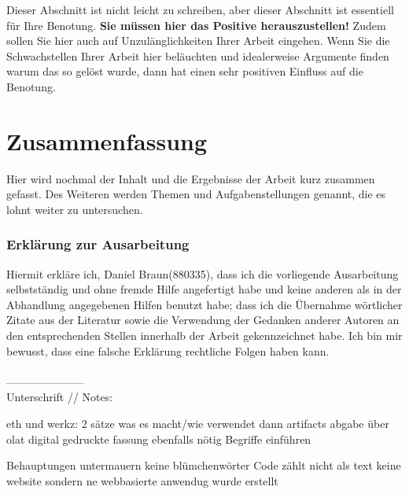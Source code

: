 \documentclass[fleqn,10pt,ngerman]{SelfArx}
\begin{document}
	Dieser Abschnitt ist nicht leicht zu schreiben, aber dieser Abschnitt ist essentiell für Ihre Benotung. \textbf{Sie müssen hier das Positive herauszustellen!} Zudem sollen Sie hier auch auf Unzul\"anglichkeiten Ihrer Arbeit eingehen. Wenn Sie die Schwachstellen Ihrer Arbeit hier bel\"auchten und idealerweise Argumente finden warum das so gelöst wurde, dann hat einen sehr positiven Einfluss auf die Benotung. 
	
	
	
	\section{Zusammenfassung}
	Hier wird nochmal der Inhalt und die Ergebnisse der Arbeit kurz zusammen gefasst. Des Weiteren werden Themen und Aufgabenstellungen genannt, die es lohnt weiter zu untersuchen.
	
	
	
	
	
	
	\subsubsection*{Erklärung zur Ausarbeitung}
	Hiermit erkläre ich, Daniel Braun(880335), dass ich die vorliegende Ausarbeitung selbstständig und ohne fremde Hilfe angefertigt habe und keine anderen als in der Abhandlung angegebenen Hilfen benutzt habe; dass ich die Übernahme wörtlicher Zitate aus der Literatur sowie die Verwendung der Gedanken anderer Autoren an den entsprechenden Stellen innerhalb der Arbeit gekennzeichnet habe. Ich bin mir bewusst, dass eine falsche Erklärung rechtliche Folgen haben kann.\\ \\
	--------------------- \\
	Unterschrift
	//
	Notes:
	
	
	eth und werkz: 2 sätze was es macht/wie verwendet dann artifacts
	abgabe über olat digital gedruckte fassung ebenfalls nötig
	Begriffe einführen

	Behauptungen untermauern
	keine blümchenwörter
	Code zählt nicht als text
	keine website sondern ne webbasierte anwendug wurde erstellt
	
\end{document}
